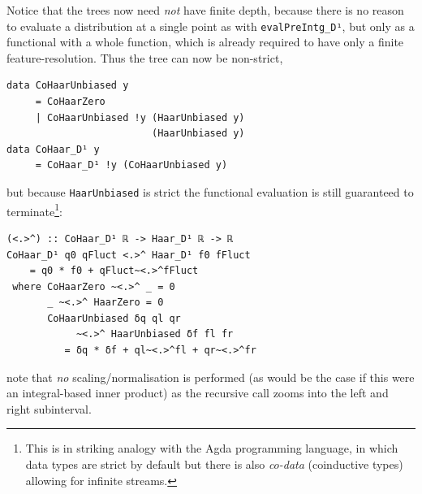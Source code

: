 \documentclass[final,sigplan,review,anonymous]{acmart}\settopmatter{printfolios=true,printccs=false,printacmref=false}
\theoremstyle{acmplain}
\theoremstyle{acmdefinition}
\begin{document}
Notice that the trees now need \emph{not} have finite depth,
because there is no reason to evaluate a distribution at a single point as with \lstinline`evalPreIntg_D¹`,
but only as a functional with a whole function,
which is already required to have only a finite feature-resolution.
Thus the tree can now be non-strict,
\begin{lstlisting}
data CoHaarUnbiased y
     = CoHaarZero
     | CoHaarUnbiased !y (HaarUnbiased y)
                         (HaarUnbiased y)
data CoHaar_D¹ y
     = CoHaar_D¹ !y (CoHaarUnbiased y)
\end{lstlisting}
but because \lstinline`HaarUnbiased` is strict the functional evaluation is still guaranteed to terminate\footnote{%
This is in striking analogy with the Agda programming language, in which data types are strict by default but there is also \emph{co-data} (coinductive types) allowing for infinite streams.
}:
\begin{lstlisting}
(<.>^) :: CoHaar_D¹ ℝ -> Haar_D¹ ℝ -> ℝ
CoHaar_D¹ q0 qFluct <.>^ Haar_D¹ f0 fFluct
    = q0 * f0 + qFluct~<.>^fFluct
 where CoHaarZero ~<.>^ _ = 0
       _ ~<.>^ HaarZero = 0
       CoHaarUnbiased δq ql qr
            ~<.>^ HaarUnbiased δf fl fr
          = δq * δf + ql~<.>^fl + qr~<.>^fr
\end{lstlisting}
note that \emph{no} scaling/normalisation is performed
(as would be the case if this were an integral-based inner product)
as the recursive call zooms into the left and right subinterval.
\end{document}
